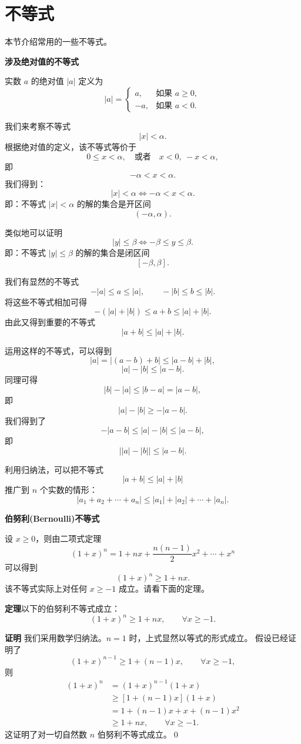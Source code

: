 \documentclass[12pt,a4paper,oneside]{ctexbook}
\begin{document}
\else%
\fi

\section{不等式}

本节介绍常用的一些不等式。

\medskip
\noindent\textbf{涉及绝对值的不等式}

实数 $a$ 的绝对值 $|a|$ 定义为
\[
|a| =
\begin{cases}
a, & \text{如果 } a\ge 0,\\
-a, & \text{如果 } a<0.
\end{cases}
\]

我们来考察不等式
\[
|x|<\alpha.
\]
根据绝对值的定义，该不等式等价于
\[
0\le x<\alpha,\quad \text{或者}\quad x<0,\ -x<\alpha,
\]
即
\[
-\alpha<x<\alpha.
\]
我们得到：
\[
|x|<\alpha \Longleftrightarrow -\alpha<x<\alpha.
\]
即：不等式 $|x|<\alpha$ 的解的集合是开区间
\[
(-\alpha,\alpha).
\]

类似地可以证明
\[
|y|\le \beta \Longleftrightarrow -\beta\le y\le \beta.
\]
即：不等式 $|y|\le \beta$ 的解的集合是闭区间
\[
[-\beta,\beta].
\]

我们有显然的不等式
\[
-|a|\le a\le |a|,\qquad -|b|\le b\le |b|.
\]
将这些不等式相加可得
\[
-(|a|+|b|)\le a+b\le |a|+|b|.
\]
由此又得到重要的不等式
\[
|a+b|\le |a|+|b|.
\]

运用这样的不等式，可以得到
\[
|a|=|(a-b)+b|\le |a-b|+|b|,
\]
\[
|a|-|b|\le |a-b|.
\]
同理可得
\[
|b|-|a|\le |b-a|=|a-b|,
\]
即
\[
|a|-|b|\ge -|a-b|.
\]
我们得到了
\[
-|a-b|\le |a|-|b|\le |a-b|,
\]
即
\[
\bigl||a|-|b|\bigr|\le |a-b|.
\]

利用归纳法，可以把不等式
\[
|a+b|\le |a|+|b|
\]
推广到 $n$ 个实数的情形：
\[
|a_1+a_2+\cdots+a_n|\le |a_1|+|a_2|+\cdots+|a_n|.
\]

\medskip
\noindent\textbf{伯努利(Bernoulli)不等式}

设 $x\ge 0$，则由二项式定理
\[
(1+x)^n
=1+nx+\frac{n(n-1)}{2}x^2+\cdots+x^n
\]
可以得到
\[
(1+x)^n\ge 1+nx.
\]
该不等式实际上对任何 $x\ge -1$ 成立。请看下面的定理。

\medskip
\textbf{定理}\quad 以下的伯努利不等式成立：
\[
(1+x)^n\ge 1+nx,\qquad \forall x\ge -1.
\]

\textbf{证明}\quad
我们采用数学归纳法。$n=1$ 时，上式显然以等式的形式成立。
假设已经证明了
\[
(1+x)^{n-1}\ge 1+(n-1)x,\qquad \forall x\ge -1,
\]
则
\begin{align*}
(1+x)^n
&=(1+x)^{n-1}(1+x)\\
&\ge [1+(n-1)x](1+x)\\
&=1+(n-1)x+x+(n-1)x^2\\
&\ge 1+nx,\qquad \forall x\ge -1.
\end{align*}
这证明了对一切自然数 $n$ 伯努利不等式成立。\qed
\end{document}
